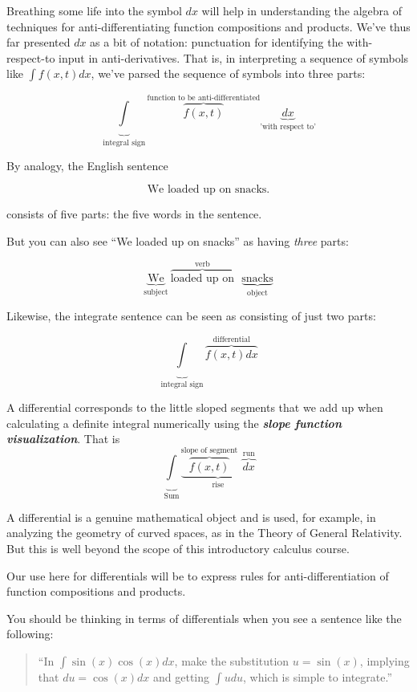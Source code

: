 \documentclass[
  letterpaper,
  DIV=11,
  numbers=noendperiod,
  oneside]{scrreprt}
\begin{document}
Breathing some life into the symbol \(dx\) will help in understanding
the algebra of techniques for anti-differentiating function compositions
and products. We've thus far presented \(dx\) as a bit of notation:
punctuation for identifying the with-respect-to input in
anti-derivatives. That is, in interpreting a sequence of symbols like
\(\int f(x,t) dx\), we've parsed the sequence of symbols into three
parts:

\[\underbrace{\int}_{\text{integral sign}} \overbrace{f(x, t)}^{\text{function to be anti-differentiated}} \underbrace{dx}_{\text{'with respect to'}}\]

By analogy, the English sentence

\[\text{We loaded up on snacks.}\]

consists of five parts: the five words in the sentence.

But you can also see ``We loaded up on snacks'' as having \emph{three}
parts:

\[\underbrace{\text{We}}_{\text{subject}}\  
\overbrace{\text{loaded up on}}^{\text{verb}}\ \ \ 
\underbrace{\text{snacks}}_{\text{object}}\]

Likewise, the integrate sentence can be seen as consisting of just two
parts:

\[\underbrace{\int}_{\text{integral sign}} \overbrace{f(x, t) dx}^{\text{differential}}\]

A differential corresponds to the little sloped segments that we add up
when calculating a definite integral numerically using the
\textbf{\emph{slope function visualization}}. That is
\[\underbrace{\int}_{\text{Sum}} \underbrace{\overbrace{f(x,t)}^\text{slope of segment}\ \  \overbrace{dx}^\text{run}}_\text{rise}\]

A differential is a genuine mathematical object and is used, for
example, in analyzing the geometry of curved spaces, as in the Theory of
General Relativity. But this is well beyond the scope of this
introductory calculus course.

Our use here for differentials will be to express rules for
anti-differentiation of function compositions and products.

You should be thinking in terms of differentials when you see a sentence
like the following:

\begin{quote}
``In \(\int \sin(x) \cos(x) dx\), make the substitution \(u = \sin(x)\),
implying that \(du = \cos(x) dx\) and getting \(\int u du\), which is
simple to integrate.''
\end{quote}
\end{document}
